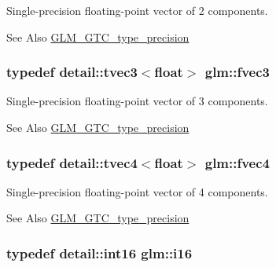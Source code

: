 Single-\/precision floating-\/point vector of 2 components. 

\begin{DoxySeeAlso}{See Also}
\hyperlink{group__gtc__type__precision}{G\-L\-M\-\_\-\-G\-T\-C\-\_\-type\-\_\-precision} 
\end{DoxySeeAlso}
\hypertarget{group__gtc__type__precision_gaa3a8ce13ad981d1e1791070f52a885c7}{
\subsubsection[{fvec3}]{\setlength{\rightskip}{0pt plus 5cm}typedef detail\-::tvec3$<$float$>$ {\bf glm\-::fvec3}}}\label{group__gtc__type__precision_gaa3a8ce13ad981d1e1791070f52a885c7}


Single-\/precision floating-\/point vector of 3 components. 

\begin{DoxySeeAlso}{See Also}
\hyperlink{group__gtc__type__precision}{G\-L\-M\-\_\-\-G\-T\-C\-\_\-type\-\_\-precision} 
\end{DoxySeeAlso}
\hypertarget{group__gtc__type__precision_ga5130b151317f24b13f1d0aa999f5fa36}{
\subsubsection[{fvec4}]{\setlength{\rightskip}{0pt plus 5cm}typedef detail\-::tvec4$<$float$>$ {\bf glm\-::fvec4}}}\label{group__gtc__type__precision_ga5130b151317f24b13f1d0aa999f5fa36}


Single-\/precision floating-\/point vector of 4 components. 

\begin{DoxySeeAlso}{See Also}
\hyperlink{group__gtc__type__precision}{G\-L\-M\-\_\-\-G\-T\-C\-\_\-type\-\_\-precision} 
\end{DoxySeeAlso}
\hypertarget{group__gtc__type__precision_ga35e5542ca05b29cc256fdafb8503d1fd}{
\subsubsection[{i16}]{\setlength{\rightskip}{0pt plus 5cm}typedef detail\-::int16 {\bf glm\-::i16}}}\label{group__gtc__type__precision_ga35e5542ca05b29cc256fdafb8503d1fd}


